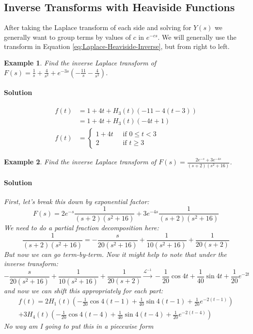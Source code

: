\documentclass[letterpaper, 11pt, openany]{book}
\theoremstyle{mytheoremstyle}
\theoremstyle{myexamplestyle}
\newtheorem{example}{Example}[section]
\newenvironment{solution}{\paragraph{\sffamily \smaller \fontseries{b}\selectfont Solution}}{\hfill\faSquare}
\begin{document}
\subsection{Inverse Transforms with Heaviside Functions}
After taking the Laplace transform of each side and solving for \(Y(s)\) we generally want to group terms by values of \(c\) in \(e^{-cs}\). We will generally use the transform in Equation \ref{eq:Laplace-Heaviside-Inverse}, but from right to left.

\begin{example}
    Find the inverse Laplace transform of \(\displaystyle F(s) = \frac{1}{s} + \frac{4}{s^2} + e^{-3s}\left(-\frac{11}{s} - \frac{4}{s^{2}}\right)\).
    \begin{solution}
        \begin{align*}
            f(t)    &= 1 + 4t + H_{3}(t)\left(-11 - 4(t-3)\right)\\
                    &= 1 + 4t + H_{3}(t)\left(-4t + 1\right)\\
            f(t)    &= \begin{cases}
                        1 + 4t \; &\text{ if }0\leq t < 3\\
                        2      \; &\text{ if }t \geq 3
                    \end{cases}
        \end{align*}
    \end{solution}
\end{example}

\begin{example}
    Find the inverse Laplace transform of \(\displaystyle F(s) = \frac{2e^{-s} + 3e^{-4s}}{(s+2)(s^{2}+16)}\).
    \begin{solution}
        First, let's break this down by exponential factor:
        \[F(s) = 2e^{-s}\frac{1}{(s+2)(s^{2}+16)} + 3e^{-4s}\frac{1}{(s+2)(s^{2}+16)}\]
        We need to do a partial fraction decomposition here:
        \[\frac{1}{(s+2)(s^{2}+16)} = -\frac{s}{20 \left(s^2+16\right)}+\frac{1}{10 \left(s^2+16\right)}+\frac{1}{20 (s+2)}\]
        But now we can go term-by-term. Now it might help to note that under the inverse transform:
        \[-\frac{s}{20 \left(s^2+16\right)}+\frac{1}{10 \left(s^2+16\right)}+\frac{1}{20 (s+2)} \xrightarrow{\mathcal{L}^{-1}} -\frac{1}{20} \cos 4t + \frac{1}{40}\sin 4t + \frac{1}{20}e^{-2t}\]
        and now we can shift this appropriately for each part:
        \begin{multline*}
            f(t) = 2H_{1}(t)\left( -\frac{1}{20} \cos 4(t-1) + \frac{1}{40}\sin 4(t-1) + \frac{1}{20}e^{-2(t-1)}\right) \\ + 3H_{4}(t)\left(-\frac{1}{20} \cos 4(t-4) + \frac{1}{40}\sin 4(t-4) + \frac{1}{20}e^{-2(t-4)}\right)
        \end{multline*}
        No way am I going to put this in a piecewise form \faDizzy
    \end{solution}
\end{example}
\end{document}
